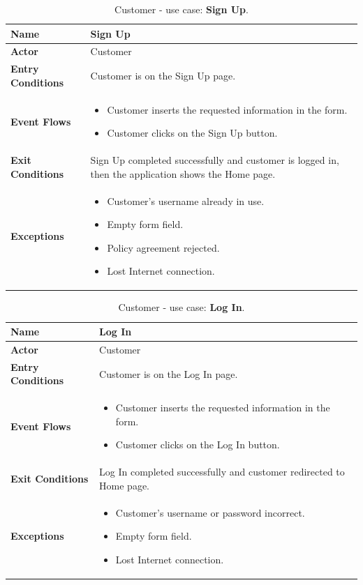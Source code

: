 \begin{table}[H]
\centering
\begin{tabular}{| m{} | m{} |} 
	\hline
	\textbf{Name} & Sign Up \\ 
	\hline
	\textbf{Actor} & Customer \\ 
	\hline
	\textbf{Entry Conditions} & Customer is on the Sign Up page. \\ 
	\hline
	\textbf{Event Flows} &
	\begin{itemize}
		\item Customer inserts the requested information in the form.
		\item Customer clicks on the Sign Up button.
	\end{itemize} \\ 
	\hline
	\textbf{Exit Conditions} & Sign Up completed successfully and customer is logged in, then the application shows the Home page. \\ 
	\hline
	\textbf{Exceptions} &
	\begin{itemize}
		\item Customer's username already in use.
		\item Empty form field.
		\item Policy agreement rejected.
		\item Lost Internet connection.
	\end{itemize} \\ 
	\hline
\end{tabular}
\caption{Customer - use case: \textbf{Sign Up}.}
\label{tableSignUp}
\end{table}

\begin{table}[H]
\centering
\begin{tabular}{| m{} | m{} |} 
	\hline
	\textbf{Name} & Log In \\ 
	\hline
	\textbf{Actor} & Customer \\ 
	\hline
	\textbf{Entry Conditions} & Customer is on the Log In page. \\ 
	\hline
	\textbf{Event Flows} &
	\begin{itemize}
	\item Customer inserts the requested information in the form.
	\item Customer clicks on the Log In button.
	\end{itemize} \\ 
	\hline
	\textbf{Exit Conditions} & Log In completed successfully and customer redirected to Home page. \\ 
	\hline
	\textbf{Exceptions} &
	\begin{itemize}
	\item Customer's username or password incorrect.
	\item Empty form field.
	\item Lost Internet connection.
	\end{itemize} \\ 
	\hline
\end{tabular}
\caption{Customer - use case: \textbf{Log In}.}
\label{tableLogIn}
\end{table}

